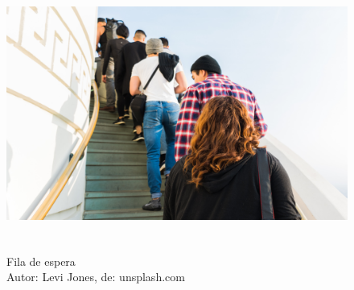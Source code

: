 \begin{figure}[h!]
\centering
\includegraphics[keepaspectratio, width=12cm, height=9cm]{imagens/06/06 - waiting queue.jpg}
\caption{Fila de espera   \\
Autor: Levi Jones, de: unsplash.com \\}
\label{fig:Fila de espera}
\end{figure}



